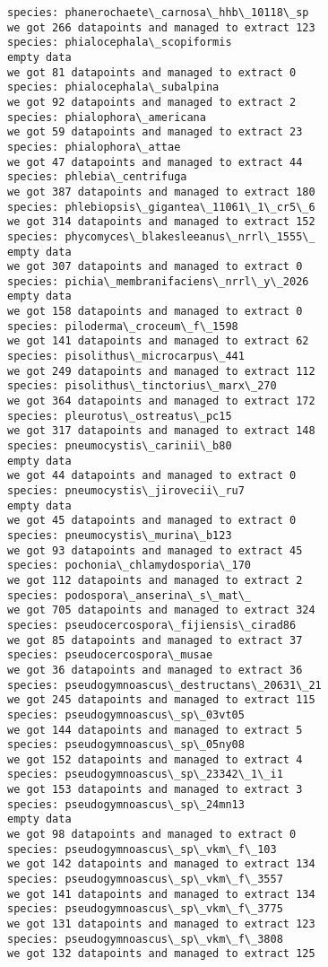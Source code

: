 \documentclass[11pt]{article}
\begin{document}
\begin{Verbatim}[commandchars=\\\{\}]
species: phanerochaete\_carnosa\_hhb\_10118\_sp
we got 266 datapoints and managed to extract 123
species: phialocephala\_scopiformis
empty data
we got 81 datapoints and managed to extract 0
species: phialocephala\_subalpina
we got 92 datapoints and managed to extract 2
species: phialophora\_americana
we got 59 datapoints and managed to extract 23
species: phialophora\_attae
we got 47 datapoints and managed to extract 44
species: phlebia\_centrifuga
we got 387 datapoints and managed to extract 180
species: phlebiopsis\_gigantea\_11061\_1\_cr5\_6
we got 314 datapoints and managed to extract 152
species: phycomyces\_blakesleeanus\_nrrl\_1555\_
empty data
we got 307 datapoints and managed to extract 0
species: pichia\_membranifaciens\_nrrl\_y\_2026
empty data
we got 158 datapoints and managed to extract 0
species: piloderma\_croceum\_f\_1598
we got 141 datapoints and managed to extract 62
species: pisolithus\_microcarpus\_441
we got 249 datapoints and managed to extract 112
species: pisolithus\_tinctorius\_marx\_270
we got 364 datapoints and managed to extract 172
species: pleurotus\_ostreatus\_pc15
we got 317 datapoints and managed to extract 148
species: pneumocystis\_carinii\_b80
empty data
we got 44 datapoints and managed to extract 0
species: pneumocystis\_jirovecii\_ru7
empty data
we got 45 datapoints and managed to extract 0
species: pneumocystis\_murina\_b123
we got 93 datapoints and managed to extract 45
species: pochonia\_chlamydosporia\_170
we got 112 datapoints and managed to extract 2
species: podospora\_anserina\_s\_mat\_
we got 705 datapoints and managed to extract 324
species: pseudocercospora\_fijiensis\_cirad86
we got 85 datapoints and managed to extract 37
species: pseudocercospora\_musae
we got 36 datapoints and managed to extract 36
species: pseudogymnoascus\_destructans\_20631\_21
we got 245 datapoints and managed to extract 115
species: pseudogymnoascus\_sp\_03vt05
we got 144 datapoints and managed to extract 5
species: pseudogymnoascus\_sp\_05ny08
we got 152 datapoints and managed to extract 4
species: pseudogymnoascus\_sp\_23342\_1\_i1
we got 153 datapoints and managed to extract 3
species: pseudogymnoascus\_sp\_24mn13
empty data
we got 98 datapoints and managed to extract 0
species: pseudogymnoascus\_sp\_vkm\_f\_103
we got 142 datapoints and managed to extract 134
species: pseudogymnoascus\_sp\_vkm\_f\_3557
we got 141 datapoints and managed to extract 134
species: pseudogymnoascus\_sp\_vkm\_f\_3775
we got 131 datapoints and managed to extract 123
species: pseudogymnoascus\_sp\_vkm\_f\_3808
we got 132 datapoints and managed to extract 125

\end{Verbatim}
\end{document}
